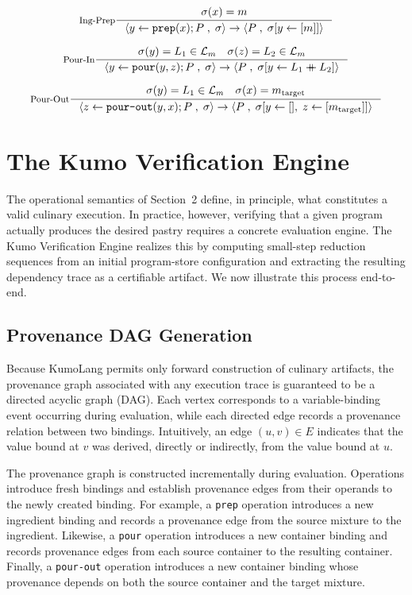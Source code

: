 \documentclass[11pt, a4paper]{article}
\begin{document}
\[
\inference[\text{Ing-Prep}]{\sigma(x) = m}
{\langle y \leftarrow \text{\texttt{prep}}(x) ; P \;,\; \sigma \rangle \to \langle P \;,\; \sigma[y \leftarrow [m]] \rangle}
\]

\[
\inference[\text{Pour-In}]{\sigma(y) = L_1 \in \mathcal{L}_m \quad \sigma(z) = L_2 \in \mathcal{L}_m}
{\langle y \leftarrow \text{\texttt{pour}}(y, z) ; P \;,\; \sigma \rangle \to \langle P \;,\; \sigma[y \leftarrow L_1 \mathbin{+\mkern-10mu+} L_2] \rangle}
\]

\[
\inference[\text{Pour-Out}]{\sigma(y) = L_1 \in \mathcal{L}_m \quad \sigma(x) = m_{\text{target}}}
{\langle z \leftarrow \text{\texttt{pour-out}}(y, x) ; P \;,\; \sigma \rangle \to \langle P \;,\; \sigma[y \leftarrow [], \; z \leftarrow [m_{\text{target}}]] \rangle}
\]

\section{The Kumo Verification Engine}

The operational semantics of Section~2 define, in principle, what constitutes a valid culinary execution. In practice, however, verifying that a given program actually produces the desired pastry requires a concrete evaluation engine. The Kumo Verification Engine realizes this by computing small-step reduction sequences from an initial program-store configuration and extracting the resulting dependency trace as a certifiable artifact. We now illustrate this process end-to-end.

\subsection{Provenance DAG Generation}
Because KumoLang permits only forward construction of culinary artifacts, the provenance graph associated with any execution trace is guaranteed to be a directed acyclic graph (DAG). Each vertex corresponds to a variable-binding event occurring during evaluation, while each directed edge records a provenance relation between two bindings. Intuitively, an edge $(u,v) \in E$ indicates that the value bound at $v$ was derived, directly or indirectly, from the value bound at $u$.

The provenance graph is constructed incrementally during evaluation. Operations introduce fresh bindings and establish provenance edges from their operands to the newly created binding. For example, a \texttt{prep} operation introduces a new ingredient binding and records a provenance edge from the source mixture to the ingredient. Likewise, a \texttt{pour} operation introduces a new container binding and records provenance edges from each source container to the resulting container. Finally, a \texttt{pour-out} operation introduces a new container binding whose provenance depends on both the source container and the target mixture.
\end{document}
